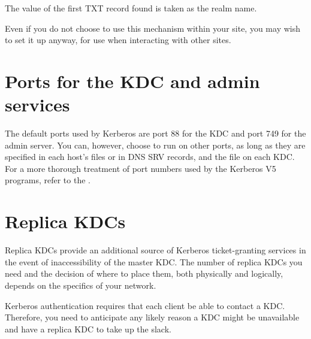 \documentclass[letterpaper,10pt,english]{sphinxmanual}
\begin{document}
%
\begin{sphinxVerbatim}[commandchars=\\\{\}]
\end{sphinxVerbatim}

The value of the first TXT record found is taken as the realm name.

Even if you do not choose to use this mechanism within your site,
you may wish to set it up anyway, for use when interacting with other sites.


\section{Ports for the KDC and admin services}
\label{\detokenize{admin/realm_config:ports-for-the-kdc-and-admin-services}}
The default ports used by Kerberos are port 88 for the KDC and port
749 for the admin server.  You can, however, choose to run on other
ports, as long as they are specified in each host’s
{\hyperref[\detokenize{admin/conf_files/krb5_conf:krb5-conf-5}]{}} files or in DNS SRV records, and the
{\hyperref[\detokenize{admin/conf_files/kdc_conf:kdc-conf-5}]{}} file on each KDC.  For a more thorough treatment of
port numbers used by the Kerberos V5 programs, refer to the
{\hyperref[\detokenize{admin/appl_servers:conf-firewall}]{}}.


\section{Replica KDCs}
\label{\detokenize{admin/realm_config:replica-kdcs}}
Replica KDCs provide an additional source of Kerberos ticket-granting
services in the event of inaccessibility of the master KDC.  The
number of replica KDCs you need and the decision of where to place them,
both physically and logically, depends on the specifics of your
network.

Kerberos authentication requires that each client be able to contact a
KDC.  Therefore, you need to anticipate any likely reason a KDC might
be unavailable and have a replica KDC to take up the slack.
\end{document}
